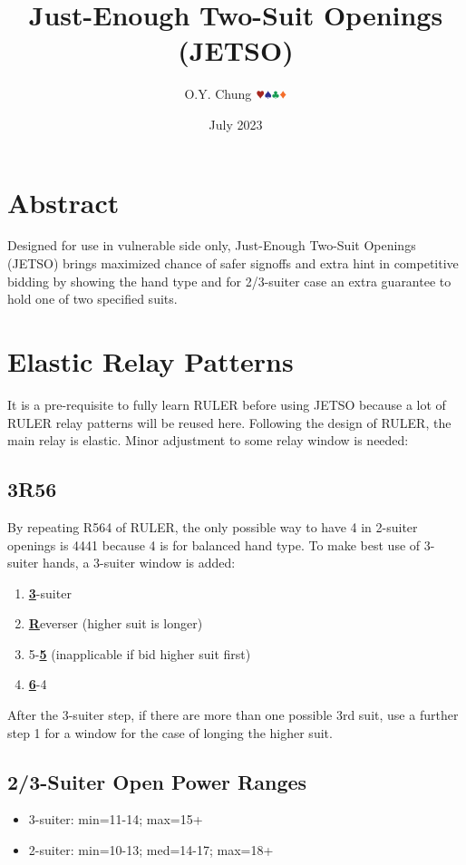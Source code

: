 \documentclass{article}
\title{Just-Enough Two-Suit Openings (JETSO)}
\author{O.Y. Chung $\hhh\sss\ccc\ddd$}
\date{July 2023}
\begin{document}
\begin{CJK*}{UTF8}{gbsn}
\end{CJK*}
\maketitle

\begin{multicols}{2}

\section{Abstract}
Designed for use in vulnerable side only, Just-Enough Two-Suit Openings (JETSO) brings maximized chance of safer signoffs and extra hint in competitive bidding by showing the hand type and for 2/3-suiter case an extra guarantee to hold one of two specified suits.

\section{Elastic Relay Patterns}
It is a pre-requisite to fully learn RULER before using JETSO because a lot of RULER relay patterns will be reused here.  Following the design of RULER, the main relay is elastic. Minor adjustment to some relay window is needed:
\subsection{3R56}
By repeating R564 of RULER, the only possible way to have 4 in 2-suiter openings is 4441 because 4 is for balanced hand type. To make best use of 3-suiter hands, a 3-suiter window is added:
\begin{enumerate}
    \item \textbf{\underline{3}}-suiter
    \item \textbf{\underline{R}}everser (higher suit is longer)
    \item 5-\textbf{\underline{5}} (inapplicable if bid higher suit first)
    \item \textbf{\underline{6}}-4
\end{enumerate}

\noindent After the 3-suiter step, if there are more than one possible 3rd suit, use a further step 1 for a window for the case of longing the higher suit.

\subsection{2/3-Suiter Open Power Ranges}
\begin{itemize}
    \item 3-suiter: min=11-14; max=15+
    \item 2-suiter: min=10-13; med=14-17; max=18+
\end{itemize}


\end{multicols}
\end{document}
